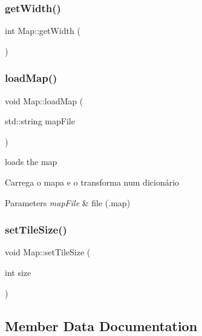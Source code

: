 \mbox{\label{classMap_afd34d12227676b3cebeed9f5fae2508f}} 
\subsubsection{\texorpdfstring{get\+Width()}{getWidth()}}
{\footnotesize\ttfamily int Map\+::get\+Width (\begin{DoxyParamCaption}{ }\end{DoxyParamCaption})}

\mbox{\label{classMap_af48de256cfde701cd70a17bce1c5b727}} 
\subsubsection{\texorpdfstring{load\+Map()}{loadMap()}}
{\footnotesize\ttfamily void Map\+::load\+Map (\begin{DoxyParamCaption}\item[{std\+::string}]{map\+File }\end{DoxyParamCaption})}



loads the map 

Carrega o mapa e o transforma num dicionário 
\begin{DoxyParams}{Parameters}
{\em map\+File} & file (.map) \\
\hline
\end{DoxyParams}
\mbox{\label{classMap_a6d9c1f8a1f65316a7a65983ad7ea9ff4}} 
\subsubsection{\texorpdfstring{set\+Tile\+Size()}{setTileSize()}}
{\footnotesize\ttfamily void Map\+::set\+Tile\+Size (\begin{DoxyParamCaption}\item[{int}]{size }\end{DoxyParamCaption})}



\subsection{Member Data Documentation}
\mbox{\label{classMap_a0546fef98caebe38385bb2e0c7a15da1}} 
